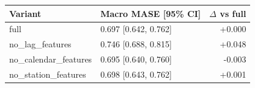 \begin{tabular}{llr}
\toprule
Variant & Macro MASE [95\% CI] & $\Delta$ vs full \\
\midrule
full & 0.697 [0.642, 0.762] & +0.000 \\
no\_lag\_features & 0.746 [0.688, 0.815] & +0.048 \\
no\_calendar\_features & 0.695 [0.640, 0.760] & -0.003 \\
no\_station\_features & 0.698 [0.643, 0.762] & +0.001 \\
\bottomrule
\end{tabular}
